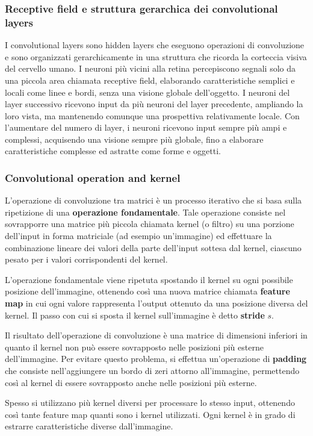 \subsubsection*{Receptive field e struttura gerarchica dei convolutional layers}
I convolutional layers sono hidden layers che eseguono operazioni di convoluzione e sono organizzati gerarchicamente in una
struttura che ricorda la corteccia visiva del cervello umano. I neuroni più vicini alla retina percepiscono segnali solo da
una piccola area chiamata receptive field, elaborando caratteristiche semplici e locali come linee e bordi, senza una visione
globale dell’oggetto. I neuroni del layer successivo ricevono input da più neuroni del layer precedente, ampliando la loro
vista, ma mantenendo comunque una prospettiva relativamente locale.  Con l’aumentare del numero di layer, i neuroni ricevono
input sempre più ampi e complessi, acquisendo una visione sempre più globale, fino a elaborare caratteristiche complesse
ed astratte come forme e oggetti.

\subsubsection*{Convolutional operation and kernel}
L'operazione di convoluzione tra matrici è un processo iterativo che si basa sulla ripetizione di una \textbf{operazione fondamentale}.
Tale operazione consiste nel sovrapporre una matrice più piccola chiamata kernel (o filtro) su una porzione dell'input in forma
matriciale (ad esempio un'immagine) ed effettuare la combinazione lineare dei valori della parte dell'input sottesa dal kernel,
ciascuno pesato per i valori corrispondenti del kernel.

L'operazione fondamentale viene ripetuta spostando il kernel su ogni possibile posizione dell'immagine, ottenendo così una
nuova matrice chiamata \textbf{feature map} in cui ogni valore rappresenta l'output ottenuto da una posizione diversa del
kernel. Il passo con cui si sposta il kernel sull'immagine è detto \textbf{stride} \(s\).

Il risultato dell'operazione di convoluzione è una matrice di dimensioni inferiori in quanto il kernel non può essere sovrapposto
nelle posizioni più esterne dell'immagine. Per evitare questo problema, si effettua un'operazione di \textbf{padding} che consiste
nell'aggiungere un bordo di zeri attorno all'immagine, permettendo così al kernel di essere sovrapposto anche nelle posizioni più
esterne.

Spesso si utilizzano più kernel diversi per processare lo stesso input, ottenendo così tante feature map quanti sono i kernel
utilizzati. Ogni kernel è in grado di estrarre caratteristiche diverse dall'immagine.

